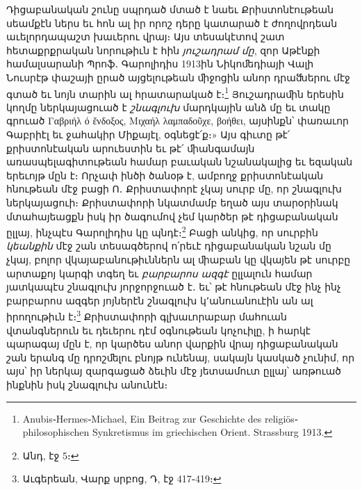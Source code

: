\documentclass{article}
\begin{document}
{Դիցաբանական շունը սպրդած մտած է նաեւ Քրիստոնէութեան սեամքէն ներս եւ հոն ալ իր որոշ դերը կատարած է ժողովրդեան աւելորդապաշտ խաւերու վրայ։ Այս տեսակէտով շատ հետաքրքրական նորութիւն է հին \emph{յուշադրամ մը}, զոր Աթէնքի համալսարանի Պրոֆ․ Գարոլիդիս 1913ին Նիկոﬔդիայի Վալի Նուսրէթ փաշայի ըրած այցելութեան ﬕջոցին անոր դրաﬓերու մէջ գտած եւ նոյն տարին ալ հրատարակած է։\footnote{Anubis֊Hermes֊Michael, Ein Beitrag zur Geschichte des religiös֊philosophischen Synkretismus im griechischen Orient. Strassburg 1913.} Յուշադրաﬕն երեսին կողմը ներկայացուած է \emph{շնագլուխ} մարդկային անձ մը եւ տակը գրուած Γαβριήλ ό ἔνδοξος, Μιχαήλ λαμπαδοῦχε, βοήθει, այսինքն՝ փառաւոր Գաբրիէլ եւ ջահակիր Միքայէլ, օգնեցէ՛ք։» Այս գիւտը թէ՛ քրիստոնէական արուեստին եւ թէ՛ ﬕանգամայն առասպելագիտութեան համար բաւական նշանակալից եւ եզական երեւոյթ մըն է։ Որչափ ինծի ծանօթ է, ամբողջ քրիստոնէական հնութեան մէջ բացի Ո․ Քրիստափորէ չկայ սուրբ մը, որ շնագլուխ ներկայացուի։ Քրիստափորի նկատմամբ եղած այս տարօրինակ մտահայեացքն իսկ իր ծագումով չեմ կարծեր թէ դիցաբանական ըլլայ, ինչպէս Գարոլիդիս կը պնդէ։\footnote{Անդ, էջ 5։} Բացի անկից, որ սուրբին \emph{կեանքին} մէջ շան տեսագծերով ո՛րեւէ դիցաբանական նշան մը չկայ, բոլոր վկայաբանութիւններն ալ ﬕաբան կը վկայեն թէ սուրբը արտաքոյ կարգի տգեղ եւ \emph{բարբարոս ազգէ} ըլլալուն համար յատկապէս շնագլուխ յորջորջուած է․ եւ՝ թէ հնութեան մէջ ինչ ինչ բարբարոս ազգեր յոյներէն շնագլուխ կ՚անուանուէին ան ալ իրողութիւն է։\footnote{Աւգերեան, Վարք սրբոց, Դ, էջ 417֊419։} Քրիստափորի գլխաւորաբար մահուան վտանգներուն եւ դեւերու դէմ օգնութեան կոչուիլը, ի հարկէ պարագայ մըն է, որ կարծես անոր վարքին վրայ դիցաբանական շան երանգ մը դրոշﬔլու բնոյթ ունենայ, սակայն կասկած չունիմ, որ այս՝ իր ներկայ զարգացած ձեւին մէջ յետսամուտ ըլլայ՝ առթուած ինքնին իսկ շնագլուխ անունէն։

}
\end{document}

